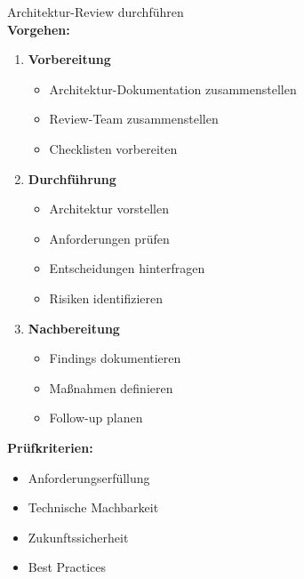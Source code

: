 \begin{KR}{Architektur-Review durchführen}\\
\textbf{Vorgehen:}
\begin{enumerate}
    \item \textbf{Vorbereitung}
    \begin{itemize}
        \item Architektur-Dokumentation zusammenstellen
        \item Review-Team zusammenstellen
        \item Checklisten vorbereiten
    \end{itemize}
    
    \item \textbf{Durchführung}
    \begin{itemize}
        \item Architektur vorstellen
        \item Anforderungen prüfen
        \item Entscheidungen hinterfragen
        \item Risiken identifizieren
    \end{itemize}
    
    \item \textbf{Nachbereitung}
    \begin{itemize}
        \item Findings dokumentieren
        \item Maßnahmen definieren
        \item Follow-up planen
    \end{itemize}
\end{enumerate}

\textbf{Prüfkriterien:}
\begin{itemize}
    \item Anforderungserfüllung
    \item Technische Machbarkeit
    \item Zukunftssicherheit
    \item Best Practices
\end{itemize}
\end{KR}



